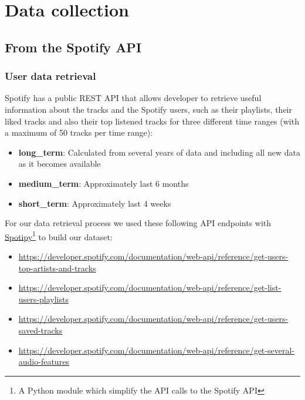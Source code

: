 \chapter{Data collection} \label{chap:data collection}
\section{From the Spotify API}
\subsection{User data retrieval} \label{subsection:user_data_retrieval}
Spotify has a public REST API that allows developer to retrieve useful information about the tracks and the Spotify users, such as their playlists, their liked tracks and also their top listened tracks for three different time ranges (with a maximum of 50 tracks per time range):
\begin{itemize}
    \item \textbf{long\_term}: Calculated from several years of data and including all new data as it becomes available
    \item \textbf{medium\_term}: Approximately last 6 months
    \item \textbf{short\_term}: Approximately last 4 weeks
\end{itemize}

For our data retrieval process we used these following API endpoints with \href{https://spotipy.readthedocs.io/en/2.22.1/}{Spotipy}\footnote{A Python module which simplify the API calls to the Spotify API} to build our dataset:
\begin{itemize}
    \item \url{https://developer.spotify.com/documentation/web-api/reference/get-users-top-artists-and-tracks}
    \item \url{https://developer.spotify.com/documentation/web-api/reference/get-list-users-playlists}
    \item \url{https://developer.spotify.com/documentation/web-api/reference/get-users-saved-tracks}
    \item \url{https://developer.spotify.com/documentation/web-api/reference/get-several-audio-features}
\end{itemize}

